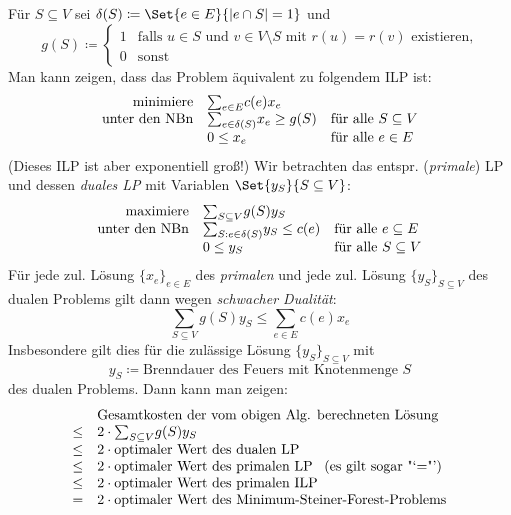 \documentclass{cheat-sheet}
\newcommand{\size}[1]{\abs{#1}} %
\begin{document}
\begin{beweisidee}
  Für $S \subseteq V$ sei $\delta(S) \coloneqq \Set{e \in E}{\size{e \cap S} = 1}$ und
  \[
     g(S) \coloneqq
     \begin{cases}
       1 & \text{falls $u \in S$ und $v \in V \setminus S$ mit $r(u) = r(v)$ existieren,} \\
       0 & \text{sonst}
     \end{cases}
  \]
  Man kann zeigen, dass das Problem äquivalent zu folgendem ILP ist:
  \[
    \begin{array}{r l l}
      \text{minimiere} & {\sum}_{e \in E} c(e) x_e \\
      \text{unter den NBn}
        & {\sum}_{e \in \delta(S)} x_e \geq g(S) & \text{für alle } S \subseteq V \\
        & 0 \leq x_e & \text{für alle } e \in E
    \end{array}
  \]
  (Dieses ILP ist aber exponentiell groß!)
  Wir betrachten das entspr. (\textit{primale}) LP und dessen \textit{duales LP} mit Variablen $\Set{y_S}{S \subseteq V}$:
  \[
    \begin{array}{r l l}
      \text{maximiere} & {\sum}_{S \subseteq V} g(S) y_S \\
      \text{unter den NBn}
        & {\sum}_{S : e \in \delta(S)} y_S \leq c(e) & \text{für alle } e \subseteq E \\
        & 0 \leq y_S & \text{für alle } S \subseteq V
    \end{array}
  \]
  Für jede zul. Lösung $\{x_e\}_{e \in E}$ des \textit{primalen} und jede zul. Lösung $\{y_S\}_{S \subseteq V}$ des dualen Problems gilt dann wegen \textit{schwacher Dualität}:
  \[ {\sum}_{S \subseteq V} g(S) y_S \leq {\sum}_{e \in E} c(e) x_e \]
  Insbesondere gilt dies für die zulässige Lösung $\{y_S\}_{S \subseteq V}$ mit
  \[
    y_S \coloneqq \text{Brenndauer des Feuers mit Knotenmenge $S$}
  \]
  des dualen Problems.
  Dann kann man zeigen:
  \[
    \begin{array}{r l}
      & \text{Gesamtkosten der vom obigen Alg. berechneten Lösung} \\
      \leq & 2 \cdot {\sum}_{S \subseteq V} g(S) y_S \\
      \leq & 2 \cdot \text{optimaler Wert des dualen LP} \\
      \leq & 2 \cdot \text{optimaler Wert des primalen LP \enspace (es gilt sogar "`$=$"')} \\
      \leq & 2 \cdot \text{optimaler Wert des primalen ILP} \\
      = & 2 \cdot \text{optimaler Wert des Minimum-Steiner-Forest-Problems}
    \end{array}
  \]
\end{beweisidee}
\end{document}

